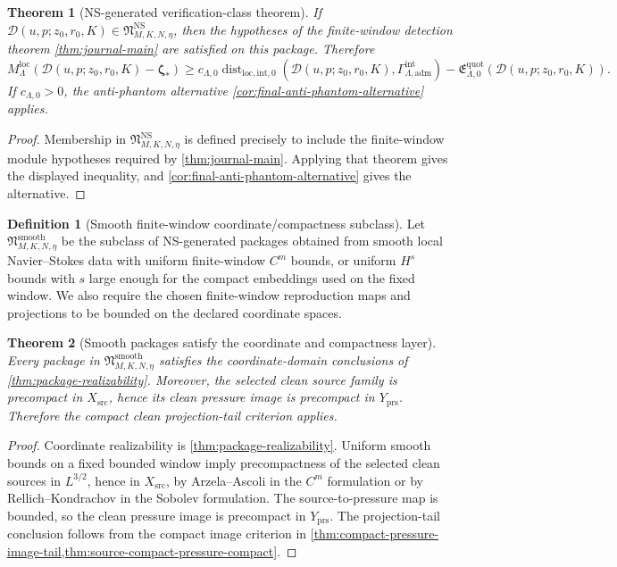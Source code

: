 \documentclass[11pt]{article}
\numberwithin{equation}{section}
\newtheorem{theorem}{Theorem}[section]
\theoremstyle{definition}
\newtheorem{definition}[definition]{Definition}
\theoremstyle{remark}
\newcommand{\NS}{\mathrm{NS}}
\newcommand{\loc}{\mathrm{loc}}
\newcommand{\intg}{\mathrm{int}}
\newcommand{\adm}{\mathrm{adm}}
\newcommand{\prs}{\mathrm{prs}}
\newcommand{\src}{\mathrm{src}}
\newcommand{\quot}{\mathrm{quot}}
\newcommand{\smooth}{\mathrm{smooth}}
\newcommand{\Dist}{\operatorname{dist}}
\newcommand{\calD}{\mathcal D}
\newcommand{\bzeta}{\boldsymbol\zeta}
\begin{document}
\begin{theorem}[NS-generated verification-class theorem]\label{thm:ns-generated-verification-final}
If \(\calD(u,p;z_0,r_0,K)\in\mathfrak N_{M,K,N,\eta}^{\NS}\), then the hypotheses of the finite-window detection theorem \cref{thm:journal-main} are satisfied on this package.  Therefore
\[
        M_\Lambda^{\loc}(\calD(u,p;z_0,r_0,K)-\bzeta_*)
        \ge
        c_{\Lambda,0}
        \Dist_{\loc,\intg,0}(\calD(u,p;z_0,r_0,K),\Gamma^{\intg}_{\Lambda,\adm})
        -
        \mathfrak E^{\quot}_{\Lambda,0}(\calD(u,p;z_0,r_0,K)).
\]
If \(c_{\Lambda,0}>0\), the anti-phantom alternative \cref{cor:final-anti-phantom-alternative} applies.
\end{theorem}

\begin{proof}
Membership in \(\mathfrak N_{M,K,N,\eta}^{\NS}\) is defined precisely to include the finite-window module hypotheses required by \cref{thm:journal-main}.  Applying that theorem gives the displayed inequality, and \cref{cor:final-anti-phantom-alternative} gives the alternative.
\end{proof}

\begin{definition}[Smooth finite-window coordinate/compactness subclass]\label{def:smooth-subclass-final}
Let \(\mathfrak N_{M,K,N,\eta}^{\smooth}\) be the subclass of NS-generated packages obtained from smooth local Navier--Stokes data with uniform finite-window \(C^m\) bounds, or uniform \(H^s\) bounds with \(s\) large enough for the compact embeddings used on the fixed window.  We also require the chosen finite-window reproduction maps and projections to be bounded on the declared coordinate spaces.
\end{definition}

\begin{theorem}[Smooth packages satisfy the coordinate and compactness layer]\label{thm:smooth-coordinate-layer-final}
Every package in \(\mathfrak N_{M,K,N,\eta}^{\smooth}\) satisfies the coordinate-domain conclusions of \cref{thm:package-realizability}.  Moreover, the selected clean source family is precompact in \(X_{\src}\), hence its clean pressure image is precompact in \(Y_{\prs}\).  Therefore the compact clean projection-tail criterion applies.
\end{theorem}

\begin{proof}
Coordinate realizability is \cref{thm:package-realizability}.  Uniform smooth bounds on a fixed bounded window imply precompactness of the selected clean sources in \(L^{3/2}\), hence in \(X_{\src}\), by Arzela--Ascoli in the \(C^m\) formulation or by Rellich--Kondrachov in the Sobolev formulation.  The source-to-pressure map is bounded, so the clean pressure image is precompact in \(Y_{\prs}\).  The projection-tail conclusion follows from the compact image criterion in \cref{thm:compact-pressure-image-tail,thm:source-compact-pressure-compact}.
\end{proof}
\end{document}
